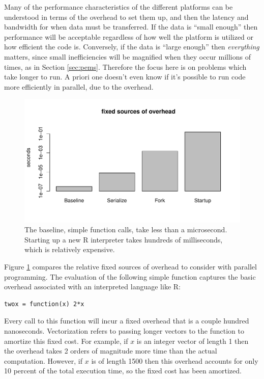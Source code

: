 \documentclass[12pt]{article}
\begin{document}
Many of the performance characteristics of the different platforms can be
understood in terms of the overhead to set them up, and then the latency
and bandwidth for when data must be transferred.  If the data is ``small
enough'' then performance will be acceptable regardless of how well the
platform is utilized or how efficient the code is. Conversely, if the data
is ``large enough'' then \emph{everything} matters, since small
inefficiencies will be magnified when they occur millions of times, as in
Section \ref{sec:pems}.  Therefore the focus here is on problems which take longer
to run. A priori one doesn't even know if it's possible to run code more
efficiently in parallel, due to the overhead.

\begin{figure}
\centering
\includegraphics[width=.8\linewidth]{compute_times/overhead}
\caption{The baseline, simple function calls, take less than a microsecond. Starting up a
    new R interpreter takes hundreds of milliseconds, which is relatively expensive.}
\label{fig:overhead}
\end{figure}

Figure \ref{fig:overhead} compares the relative fixed sources of overhead to
consider with parallel programming. The evaluation of the following simple
function captures the basic overhead associated with an interpreted
language like R:
\begin{verbatim}
twox = function(x) 2*x
\end{verbatim}
Every call to this function will incur a fixed overhead that is a couple
hundred nanoseconds. Vectorization refers to passing longer vectors to the
function to amortize this fixed cost. For example, if $x$ is an integer
vector of length 1 then the overhead takes 2 orders of magnitude more time
than the actual computation. However, if $x$ is of length 1500 then this
overhead accounts for only 10 percent of the total execution time, so the
fixed cost has been amortized.
\end{document}
